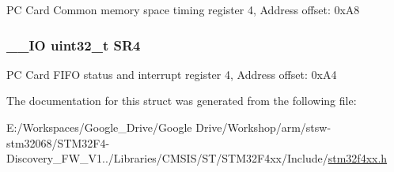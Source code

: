 P\-C Card Common memory space timing register 4, Address offset\-: 0x\-A8 \hypertarget{struct_f_s_m_c___bank4___type_def_a8218d6e11dae5d4468c69303dec0b4fc}{
\subsubsection[{S\-R4}]{\setlength{\rightskip}{0pt plus 5cm}\-\_\-\-\_\-\-I\-O uint32\-\_\-t S\-R4}}\label{struct_f_s_m_c___bank4___type_def_a8218d6e11dae5d4468c69303dec0b4fc}
P\-C Card F\-I\-F\-O status and interrupt register 4, Address offset\-: 0x\-A4 

The documentation for this struct was generated from the following file\-:\begin{DoxyCompactItemize}
\item 
E\-:/\-Workspaces/\-Google\-\_\-\-Drive/\-Google Drive/\-Workshop/arm/stsw-\/stm32068/\-S\-T\-M32\-F4-\/\-Discovery\-\_\-\-F\-W\-\_\-\-V1../\-Libraries/\-C\-M\-S\-I\-S/\-S\-T/\-S\-T\-M32\-F4xx/\-Include/\hyperlink{stm32f4xx_8h}{stm32f4xx.\-h}\end{DoxyCompactItemize}
